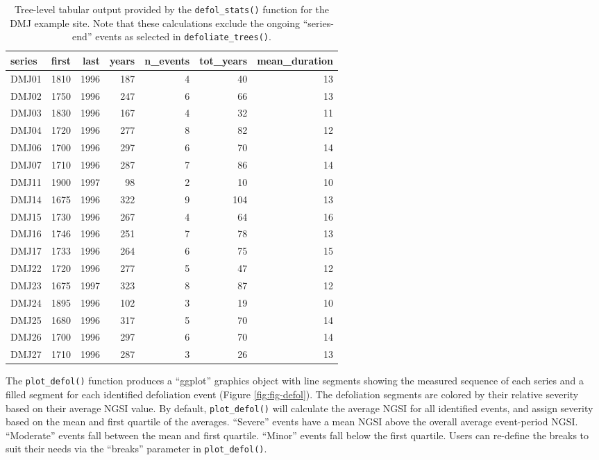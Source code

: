 \documentclass[review]{elsarticle} %
\begin{document}
\begin{table}[!h]

\caption{\label{tab:tbl-defol}Tree-level tabular output provided by the \texttt{defol\_stats()} function for the DMJ example site. Note that these calculations exclude the ongoing ``series-end'' events as selected in \texttt{defoliate\_trees()}.}
\centering
\begin{tabular}[t]{lrrrrrr}
\toprule
series & first & last & years & n\_events & tot\_years & mean\_duration\\
\midrule
DMJ01 & 1810 & 1996 & 187 & 4 & 40 & 13\\
DMJ02 & 1750 & 1996 & 247 & 6 & 66 & 13\\
DMJ03 & 1830 & 1996 & 167 & 4 & 32 & 11\\
DMJ04 & 1720 & 1996 & 277 & 8 & 82 & 12\\
DMJ06 & 1700 & 1996 & 297 & 6 & 70 & 14\\
\addlinespace
DMJ07 & 1710 & 1996 & 287 & 7 & 86 & 14\\
DMJ11 & 1900 & 1997 & 98 & 2 & 10 & 10\\
DMJ14 & 1675 & 1996 & 322 & 9 & 104 & 13\\
DMJ15 & 1730 & 1996 & 267 & 4 & 64 & 16\\
DMJ16 & 1746 & 1996 & 251 & 7 & 78 & 13\\
\addlinespace
DMJ17 & 1733 & 1996 & 264 & 6 & 75 & 15\\
DMJ22 & 1720 & 1996 & 277 & 5 & 47 & 12\\
DMJ23 & 1675 & 1997 & 323 & 8 & 87 & 12\\
DMJ24 & 1895 & 1996 & 102 & 3 & 19 & 10\\
DMJ25 & 1680 & 1996 & 317 & 5 & 70 & 14\\
\addlinespace
DMJ26 & 1700 & 1996 & 297 & 6 & 70 & 14\\
DMJ27 & 1710 & 1996 & 287 & 3 & 26 & 13\\
\bottomrule
\end{tabular}
\end{table}

The \texttt{plot\_defol()} function produces a ``ggplot'' graphics object with line segments showing the measured sequence of each series and a filled segment for each identified defoliation event (Figure \ref{fig:fig-defol}). The defoliation segments are colored by their relative severity based on their average NGSI value. By default, \texttt{plot\_defol()} will calculate the average NGSI for all identified events, and assign severity based on the mean and first quartile of the averages. ``Severe'' events have a mean NGSI above the overall average event-period NGSI. ``Moderate'' events fall between the mean and first quartile. ``Minor'' events fall below the first quartile. Users can re-define the breaks to suit their needs via the ``breaks'' parameter in \texttt{plot\_defol()}.
\end{document}
